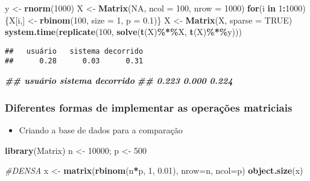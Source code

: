 \documentclass[
]{article}
\newenvironment{Shaded}{\begin{snugshade}}{\end{snugshade}}
\newcommand{\AttributeTok}[1]{\textcolor[rgb]{0.13,0.29,0.53}{#1}}
\newcommand{\CommentTok}[1]{\textcolor[rgb]{0.56,0.35,0.01}{\textit{#1}}}
\newcommand{\ConstantTok}[1]{\textcolor[rgb]{0.56,0.35,0.01}{#1}}
\newcommand{\ControlFlowTok}[1]{\textcolor[rgb]{0.13,0.29,0.53}{\textbf{#1}}}
\newcommand{\DecValTok}[1]{\textcolor[rgb]{0.00,0.00,0.81}{#1}}
\newcommand{\DocumentationTok}[1]{\textcolor[rgb]{0.56,0.35,0.01}{\textbf{\textit{#1}}}}
\newcommand{\FloatTok}[1]{\textcolor[rgb]{0.00,0.00,0.81}{#1}}
\newcommand{\FunctionTok}[1]{\textcolor[rgb]{0.13,0.29,0.53}{\textbf{#1}}}
\newcommand{\NormalTok}[1]{#1}
\newcommand{\OtherTok}[1]{\textcolor[rgb]{0.56,0.35,0.01}{#1}}
\newcommand{\SpecialCharTok}[1]{\textcolor[rgb]{0.81,0.36,0.00}{\textbf{#1}}}
\providecommand{\tightlist}{%
  \setlength{\itemsep}{0pt}\setlength{\parskip}{0pt}}
\begin{document}
\begin{Shaded}
\begin{Highlighting}[]
\NormalTok{y }\OtherTok{\textless{}{-}} \FunctionTok{rnorm}\NormalTok{(}\DecValTok{1000}\NormalTok{)}
\NormalTok{X }\OtherTok{\textless{}{-}} \FunctionTok{Matrix}\NormalTok{(}\ConstantTok{NA}\NormalTok{, }\AttributeTok{ncol =} \DecValTok{100}\NormalTok{, }\AttributeTok{nrow =} \DecValTok{1000}\NormalTok{)}
\ControlFlowTok{for}\NormalTok{(i }\ControlFlowTok{in} \DecValTok{1}\SpecialCharTok{:}\DecValTok{1000}\NormalTok{) \{X[i,] }\OtherTok{\textless{}{-}} \FunctionTok{rbinom}\NormalTok{(}\DecValTok{100}\NormalTok{, }\AttributeTok{size =} \DecValTok{1}\NormalTok{, }\AttributeTok{p =} \FloatTok{0.1}\NormalTok{)\}}
\NormalTok{X }\OtherTok{\textless{}{-}} \FunctionTok{Matrix}\NormalTok{(X, }\AttributeTok{sparse =} \ConstantTok{TRUE}\NormalTok{)}
\FunctionTok{system.time}\NormalTok{(}\FunctionTok{replicate}\NormalTok{(}\DecValTok{100}\NormalTok{, }\FunctionTok{solve}\NormalTok{(}\FunctionTok{t}\NormalTok{(X)}\SpecialCharTok{\%*\%}\NormalTok{X, }\FunctionTok{t}\NormalTok{(X)}\SpecialCharTok{\%*\%}\NormalTok{y)))}
\end{Highlighting}
\end{Shaded}

\begin{verbatim}
##   usuário   sistema decorrido 
##      0.28      0.03      0.31
\end{verbatim}

\begin{Shaded}
\begin{Highlighting}[]
\DocumentationTok{\#\# usuário sistema decorrido}
\DocumentationTok{\#\# 0.223 0.000 0.224}
\end{Highlighting}
\end{Shaded}

\hypertarget{diferentes-formas-de-implementar-as-operauxe7uxf5es-matriciais}{%
\subsubsection{Diferentes formas de implementar as operações
matriciais}\label{diferentes-formas-de-implementar-as-operauxe7uxf5es-matriciais}}

\begin{itemize}
\tightlist
\item
  Criando a base de dados para a comparação
\end{itemize}

\begin{Shaded}
\begin{Highlighting}[]
\FunctionTok{library}\NormalTok{(Matrix)}
\NormalTok{n }\OtherTok{\textless{}{-}} \DecValTok{10000}\NormalTok{; p }\OtherTok{\textless{}{-}} \DecValTok{500}

\CommentTok{\#DENSA}
\NormalTok{x }\OtherTok{\textless{}{-}} \FunctionTok{matrix}\NormalTok{(}\FunctionTok{rbinom}\NormalTok{(n}\SpecialCharTok{*}\NormalTok{p, }\DecValTok{1}\NormalTok{, }\FloatTok{0.01}\NormalTok{), }\AttributeTok{nrow=}\NormalTok{n, }\AttributeTok{ncol=}\NormalTok{p)}
\FunctionTok{object.size}\NormalTok{(x)}
\end{Highlighting}
\end{Shaded}
\end{document}
